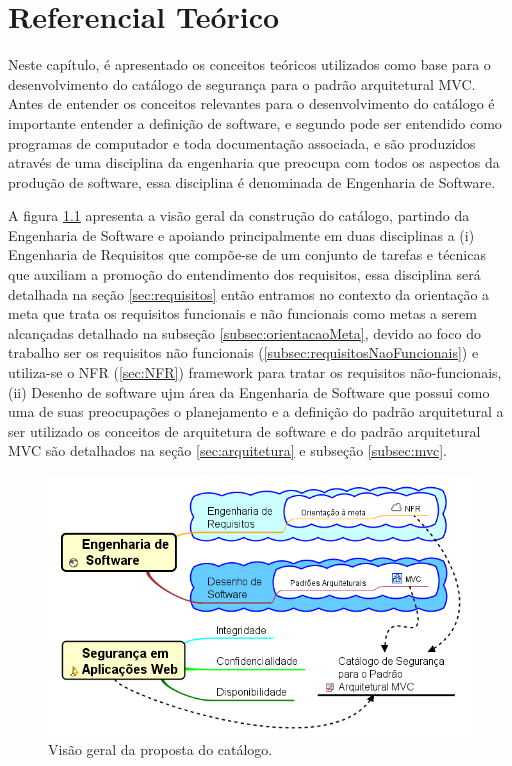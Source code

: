 \chapter[Referencial Teórico]{Referencial Teórico}

Neste capítulo, é apresentado os conceitos teóricos utilizados como base para o desenvolvimento do catálogo de segurança para o padrão arquitetural MVC. Antes de entender os conceitos relevantes para o desenvolvimento do catálogo é importante entender a definição de software, e segundo \cite{sommerville2003engenharia} pode ser entendido como programas de computador e toda documentação associada, e são produzidos através de uma disciplina da engenharia que preocupa com todos os aspectos da produção de software, essa disciplina é denominada de Engenharia de Software.

A figura \ref{BigPicture} apresenta a visão geral da construção do catálogo, partindo da Engenharia de Software e apoiando principalmente em duas disciplinas a  (i) Engenharia de Requisitos que compõe-se de um conjunto de tarefas e técnicas que auxiliam a promoção do entendimento dos requisitos, essa disciplina será detalhada na seção \ref{sec:requisitos} então entramos no contexto da orientação a meta que trata os requisitos funcionais e não funcionais como metas a serem alcançadas detalhado na subseção \ref{subsec:orientacaoMeta}, devido ao foco do trabalho ser os requisitos não funcionais (\ref{subsec:requisitosNaoFuncionais}) e utiliza-se o NFR (\ref{sec:NFR}) framework para tratar os requisitos não-funcionais, (ii) Desenho de software ujm área da Engenharia de Software que possui como uma de suas preocupações o planejamento e a definição do padrão arquitetural a ser utilizado
os conceitos de arquitetura de software e do padrão arquitetural MVC são detalhados na seção \ref{sec:arquitetura} e subseção \ref{subsec:mvc}.

\begin{figure}[h]
	\centering
	\includegraphics[keepaspectratio=true,scale=0.8]{figuras/bigPicture.png}
	\caption{Visão geral da proposta do catálogo.}
	\label{BigPicture}
\end{figure}

